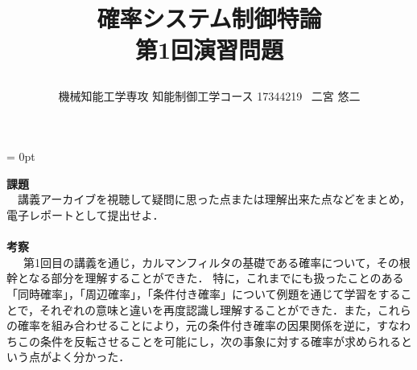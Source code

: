 \documentclass[a4paper,11pt]{jarticle}
\title{\vspace{-20truemm}
{\normalsize \rightline{平成29年\ 10月\ 17日}}
{\large 確率システム制御特論\\}
第1回演習問題\\
\date{}
\vspace{-2truemm}}
\author{機械知能工学専攻 知能制御工学コース \hspace{3mm} 17344219 \ 二宮 悠二}
\begin{document}
\parindent = 0pt %
\titlepage
\maketitle
{\Large{\bf 課題}}
\vspace{2mm}\\
\ \ 講義アーカイブを視聴して疑問に思った点または理解出来た点などをまとめ，電子レポートとして提出せよ．\\\\
{\Large{\bf 考察}}
\vspace{2mm}\\
\ \ \ 第1回目の講義を通じ，カルマンフィルタの基礎である確率について，その根幹となる部分を理解することができた．
特に，これまでにも扱ったことのある「同時確率」，「周辺確率」，「条件付き確率」について例題を通じて学習をすることで，それぞれの意味と違いを再度認識し理解することができた．また，これらの確率を組み合わせることにより，元の条件付き確率の因果関係を逆に，すなわちこの条件を反転させることを可能にし，次の事象に対する確率が求められるという点がよく分かった．

\end{document}
